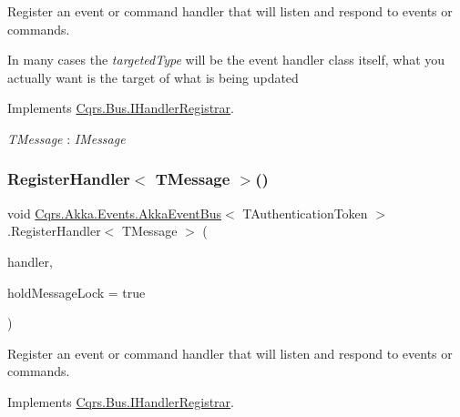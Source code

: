 Register an event or command handler that will listen and respond to events or commands. 

In many cases the {\itshape targeted\+Type}  will be the event handler class itself, what you actually want is the target of what is being updated 

Implements \hyperlink{interfaceCqrs_1_1Bus_1_1IHandlerRegistrar_ab6ca4dfdc54a5aeebe4651dbdb479f55}{Cqrs.\+Bus.\+I\+Handler\+Registrar}.

\begin{Desc}
\item[Type Constraints]\begin{description}
\item[{\em T\+Message} : {\em I\+Message}]\end{description}
\end{Desc}
\mbox{\label{classCqrs_1_1Akka_1_1Events_1_1AkkaEventBus_a6795dfcaf611ce1b50310f442cef0546}} 
\subsubsection{\texorpdfstring{Register\+Handler$<$ T\+Message $>$()}{RegisterHandler< TMessage >()}\hspace{0.1cm}{\footnotesize\ttfamily [2/2]}}
{\footnotesize\ttfamily void \hyperlink{classCqrs_1_1Akka_1_1Events_1_1AkkaEventBus}{Cqrs.\+Akka.\+Events.\+Akka\+Event\+Bus}$<$ T\+Authentication\+Token $>$.Register\+Handler$<$ T\+Message $>$ (\begin{DoxyParamCaption}\item[{Action$<$ T\+Message $>$}]{handler,  }\item[{bool}]{hold\+Message\+Lock = {\ttfamily true} }\end{DoxyParamCaption})}



Register an event or command handler that will listen and respond to events or commands. 



Implements \hyperlink{interfaceCqrs_1_1Bus_1_1IHandlerRegistrar_a07792dcc9a8b272709ff2e2dd336a642}{Cqrs.\+Bus.\+I\+Handler\+Registrar}.

